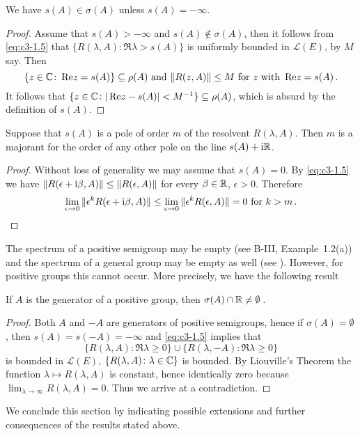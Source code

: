 \begin{corollary}\label{cor:c3-1.4}
We have $s(A) \in \sigma(A)$ unless $s(A) = -\infty$.
\end{corollary}
\begin{proof}
Assume that $s(A) > -\infty$ and $s(A) \notin \sigma(A)$, then it follows from \eqref{eq:c3-1.5} that $\{R(\lambda,A) \colon \Re \lambda > s(A)\}$ is uniformly bounded in $\mathcal{L}(E)$, by $M$ say. 
Then
\[
\{z \in \mathbb{C}  \colon \mathop{}\!\mathrm{Re}  z = s(A)\} \subseteq \rho(A) \text{ and } 
\|R(z,A)\| \leq M \text{ for } z  \text{ with } \mathop{}\!\mathrm{Re} z = s(A)\,.
\]
It follows that $\{z \in \mathbb{C}  \colon |\mathop{}\!\mathrm{Re}  z - s(A)| < M^{-1}\} \subseteq \rho(A)$, which is absurd by the definition of $s(A)$.
\end{proof}

\begin{corollary}\label{cor:c3-1.5}
Suppose that $s(A)$ is a pole of order $m$ of the resolvent $R(\lambda,A)$.
Then $m$ is a majorant for the order of any other pole on the line $s(A) + \mathrm{i}\mathbb{R} $.
\end{corollary}
\begin{proof}
Without loss of generality we may assume that $s(A) = 0$.
By \eqref{eq:c3-1.5} we have $\|R(\epsilon+\mathrm{i}\beta ,A)\| \leq \|R(\epsilon,A)\|$ for every $\beta \in \mathbb{R} $, $\epsilon > 0$.
Therefore 
\[
\lim_{\epsilon\to 0}\|\epsilon^k R(\epsilon+\mathrm{i}\beta ,A)\| \leq \lim_{\epsilon\to 0}\|\epsilon^k R(\epsilon,A)\| = 0 \text{ for } k > m\,.
\]
\end{proof}
The spectrum of a positive semigroup may be empty (see B-III, Example~1.2(a)) and the spectrum of a general group may be empty as well (see \citet[Section~23.16]{hillephillips:1957}).
However, for positive groups this cannot occur.
More precisely, we have the following result
\begin{corollary}\label{cor:c3-1.6}
If $A$ is the generator of a positive group, then $\sigma(A)\cap\mathbb{R}  \neq \emptyset$\,.
\end{corollary}
\begin{proof}
Both $A$ and $-A$ are generators of positive semigroups, hence if $\sigma(A) = \emptyset$, then $s(A) = s(-A) = -\infty$ and \eqref{eq:c3-1.5} implies that 
\[
\{R(\lambda,A) \colon \Re  \lambda \geq 0\} \cup \{R(\lambda,-A) \colon \Re  \lambda \geq 0\}
\]
is bounded in $\mathcal{L}(E)$, \ie  $\{R(\lambda,A) \colon \lambda \in \mathbb{C} \}$ is bounded.
By Liouville's Theorem the function $\lambda \mapsto R(\lambda,A)$ is constant, hence identically zero because $\displaystyle \lim_{\lambda\to\infty}R(\lambda,A) = 0$.
Thus we arrive at a contradiction.
\end{proof}
We conclude this section by indicating possible extensions and further consequences of the results stated above.

